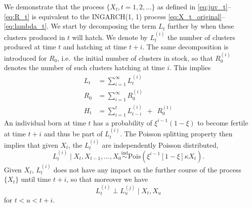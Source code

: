 \documentclass[10pt,a4paper]{article}
\begin{document}
We demonstrate that the process $\{X_t, t = 1, 2, \dots\}$ as defined in \eqref{eq:juv_t}--\eqref{eq:R_t} is equivalent to the INGARCH(1, 1) process \eqref{eq:X_t_original}--\eqref{eq:lambda_t}. We start by decomposing the term $L_t$ further by when these clusters produced in $t$ will hatch. We denote by $L_t^{(i)}$ the number of clusters produced at time $t$ and hatching at time $t + i$. The same decomposition is introduced for $R_0$, i.e.\ the initial number of clusters in stock, so that $R^{(i)}_0$ denotes the number of such clusters hatching at time $i$. This implies
\begin{align*}
L_t & = \sum_{i = 1}^\infty L_t^{(i)}\\
R_0 & = \sum_{i = 1}^\infty R_0^{(i)}\\
H_t & = \sum_{i = 1}^{t} L_{t - i}^{(i)} \ \ + \ \ R_0^{(t)}
\end{align*}
An individual born at time $t$ has a probability of $\xi^{i - 1}(1 - \xi)$ to become fertile at time $t + i$ and thus be part of $L_t^{(i)}$. The Poisson splitting property \cite{Kingman1993} then implies that given $X_t$, the $L_t^{(i)}$ are independently Poisson distributed,
$$
L_t^{(i)} \mid X_t, X_{t - 1}, \dots, X_0 \stackrel{\text{ind}}{\sim} \text{Pois}(\xi^{i - 1}[1 - \xi]\kappa X_t). %
$$
Given $X_t$, $L_t^{(i)}$ does not have any impact on the further course of the process $\{X_t\}$ until time $t + i$, so that moreover we have
$$
L_t^{(i)} \perp L_u^{(j)} \mid X_t, X_u
$$
for $t < u < t + i$.
\end{document}
